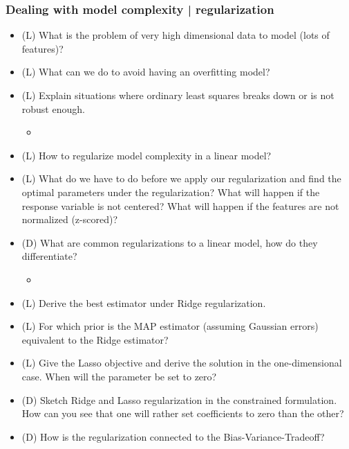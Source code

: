 \subsubsection*{Dealing with model complexity | regularization}
\begin{itemize}
    \item (L) What is the problem of very high dimensional data to model (lots of features)?
    \answerboxS
    \item (L) What can we do to avoid having an overfitting model?
    \answerboxS
    \item (L) Explain situations where ordinary least squares breaks down or is not robust enough.
    \begin{itemize}
        \item {}
    \end{itemize}
    \answerboxM
    \item (L) How to regularize model complexity in a linear model?
    \answerboxM
    \item (L) What do we have to do before we apply our regularization and find the optimal parameters under the regularization? 
    What will happen if the response variable is not centered? What will happen 
    if the features are not normalized (z-scored)?
    \answerboxM
    \item (D) What are common regularizations to a linear model, how do they differentiate?
    \begin{itemize}
        \item {}
    \end{itemize}
    \answerboxM
    \item (L) Derive the best estimator under Ridge regularization.
    \answerboxM
    \item (L) For which prior is the MAP estimator (assuming Gaussian errors) equivalent to the Ridge estimator?
    \answerboxM
    \item (L) Give the Lasso objective and derive the solution in the one-dimensional case. When will
    the parameter be set to zero?
    \answerboxL
    \item (D) Sketch Ridge and Lasso regularization in the constrained formulation. How can you
    see that one will rather set coefficients to zero than the other?
    \answerboxL
    \item (D) How is the regularization connected to the Bias-Variance-Tradeoff?
    \answerboxM
\end{itemize}

